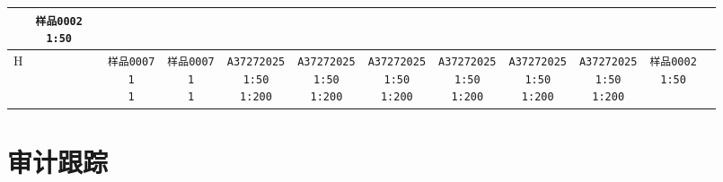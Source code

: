 \documentclass[UTF8,10pt,a4paper,fontset=fandol]{ctexart}
\begin{document}
\begin{center}
{\begin{tabular}{c|c|c|c|c|c|c|c|c|c|c|c|c}
  & \texttt{样品0002\\1:50}
  & \\
\hline
H & &
  & \texttt{样品0007\\1\\1}
  & \texttt{样品0007\\1\\1}
  & \texttt{A37272025\\1:50\\1:200}
  & \texttt{A37272025\\1:50\\1:200}
  & \texttt{A37272025\\1:50\\1:200}
  & \texttt{A37272025\\1:50\\1:200}
  & \texttt{A37272025\\1:50\\1:200}
  & \texttt{A37272025\\1:50\\1:200}
  & \texttt{样品0002\\1:50}
  & \\
\hline
\end{tabular}%
}
\end{center}

\section*{审计跟踪}
\end{document}
